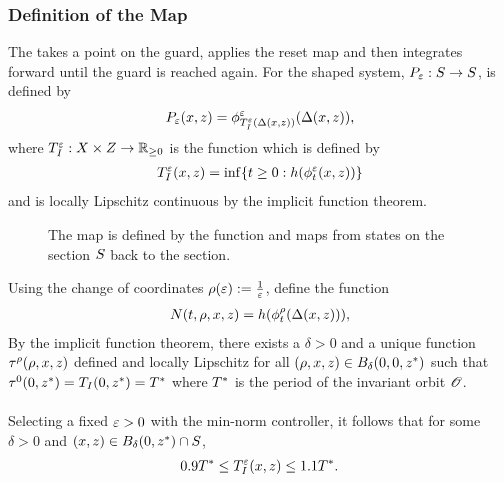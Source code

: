 \begin{frame}[t]
  \frametitle{Definition of the \Poincare{} Map}
   {
    The  takes a point on the guard, applies
    the reset map and then integrates forward until the guard is reached
    again. For the shaped system, $\Pe : \S \to \S$, is defined by
    \begin{align*}
      \Pe\argsxz = \floweps_{\TIeDelta}\argsDeltaxz,
    \end{align*}
    where $\TIe : \zdX \times \zdZ \to \Rnn$ is the \tti{} function which is
    defined by
    \begin{align*}
      \TIe\argsxz = \inf \{ t \geq 0 : h(\flowepst\argsxz) \}
    \end{align*}
    and is locally Lipschitz continuous by the implicit function theorem.
  }

   {
    \begin{figure}    
      \centering
      \def\svgwidth{.78\columnwidth}
      
      \caption{The \Poincare{} map is defined by the \tti{} function and maps
        from states on the \Poincare{} section $\S$ back to the section.}
    \end{figure}
  }

   {
    Using the change of coordinates $\rho(\resclfparam) :=
    \tfrac{1}{\resclfparam}$, define the function
    \begin{align*}
      N(t, \rho, \zdx, \zdz) = h(\flowrhot(\Deltaxz)),
    \end{align*}
    By the implicit function theorem, there exists a $\delta > 0$ and a unique
    function $\taurho(\rho, \zdx, \zdz)$ defined and locally Lipschitz for all
    $(\rho, \zdx, \zdz) \in \B_{\delta}(0, 0, \zdzst)$ such that $\tau^{0}(0,
    \zdzst) = \TI(0, \zdzst) = \Tst$ where $\Tst$ is the period of the invariant
    orbit $\orbit$.\\ \ \\

    Selecting a fixed $\resclfparam > 0$ with the min-norm controller, it
    follows that for some $\delta > 0$ and $\argsxz \in \B_{\delta}\xzst \cap
    \S$,
    \begin{align*}
      \label{eq:TIe-bounds}
      0.9 \Tst \leq \TIe\argsxz \leq 1.1 \Tst.
    \end{align*}
  }
\end{frame}

